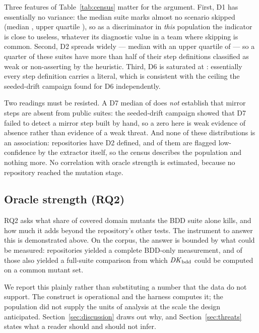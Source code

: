 Three features of Table~\ref{tab:census} matter for the argument. First, D1 has essentially no
variance: the median suite marks almost no scenario skipped (median \CensusDoneMedian, upper quartile
\CensusDoneQthree), so as a discriminator in \emph{this} population the indicator is close to useless,
whatever its diagnostic value in a team where skipping is common. Second, D2 spreads widely --- median
\CensusDtwoMedian{} with an upper quartile of \CensusDtwoQthree{} --- so a quarter of these suites have
more than half of their step definitions classified as weak or non-asserting by the heuristic.
Third, D6 is saturated at \CensusDsixMedian: essentially every step definition carries a literal, which
is consistent with the ceiling the seeded-drift campaign found for D6 independently.

Two readings must be resisted. A D7 median of \CensusDsevenMedian{} does \emph{not} establish that
mirror steps are absent from public suites: the seeded-drift campaign showed that D7 failed to detect a
mirror step built by hand, so a zero here is weak evidence of absence rather than evidence of a weak
threat. And none of these distributions is an association: \CensusDtwoN{} repositories have D2 defined,
and \CensusLowConf{} of them are flagged low-confidence by the extractor itself, so the census
describes the population and nothing more. No correlation with oracle strength is estimated, because
no repository reached the mutation stage.

\subsection{Oracle strength (RQ2)}

RQ2 asks what share of covered domain mutants the BDD suite alone kills, and how much it adds beyond
the repository's other tests. The instrument to answer this is demonstrated above. On the corpus, the
answer is bounded by what could be measured: \Nmeasured{} repositories yielded a complete
BDD-only measurement, and \Nwithfull{} of those also yielded a full-suite comparison from which
$\mathit{DK}_{\mathrm{bdd}}$ could be computed on a common mutant set.

\MeasuredTable

We report this plainly rather than substituting a number that the data do not support. The construct
is operational and the harness computes it; the population did not supply the units of analysis at the
scale the design anticipated. Section~\ref{sec:discussion} draws out why, and
Section~\ref{sec:threats} states what a reader should and should not infer.

